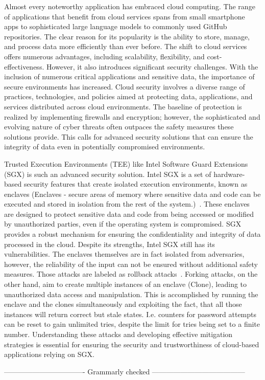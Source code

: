 
Almost every noteworthy application has embraced cloud computing. The range of applications that benefit from cloud services spans from small smartphone apps to sophisticated large language models to commonly used GitHub repositories. The clear reason for its popularity is the ability to store, manage, and process data more efficiently than ever before. The shift to cloud services offers numerous advantages, including scalability, flexibility, and cost-effectiveness. However, it also introduces significant security challenges. With the inclusion of numerous critical applications and sensitive data, the importance of secure environments has increased. Cloud security involves a diverse range of practices, technologies, and policies aimed at protecting data, applications, and services distributed across cloud environments. The baseline of protection is realized by implementing firewalls and encryption; however, the sophisticated and evolving nature of cyber threats often outpaces the safety measures these solutions provide. This calls for advanced security solutions that can ensure the integrity of data even in potentially compromised environments.


Trusted Execution Environments (TEE) like Intel Software Guard Extensions (SGX) is such an advanced security solution. Intel SGX is a set of hardware-based security features that create isolated execution environments, known as enclaves (Enclaves - secure areas of memory where sensitive data and code can be executed and stored in isolation from the rest of the system.)~\cite{nfw}. These enclaves are designed to protect sensitive data and code from being accessed or modified by unauthorized parties, even if the operating system is compromised. SGX provides a robust mechanism for ensuring the confidentiality and integrity of data processed in the cloud. Despite its strengths, Intel SGX still has its vulnerabilities. The enclaves themselves are in fact isolated from adversaries, however, the reliability of the input can not be ensured without additional safety measures. Those attacks are labeled as rollback attacks~\cite{esccc}. 
Forking attacks, on the other hand, aim to create multiple instances of an enclave (Clone), leading to unauthorized data access and manipulation. This is accomplished by running the enclave and the clones simultaneously and exploiting the fact, that all those instances will return correct but stale states. I.e. counters for password attempts can be reset to gain unlimited tries, despite the limit for tries being set to a finite number. Understanding these attacks and developing effective mitigation strategies is essential for ensuring the security and trustworthiness of cloud-based applications relying on SGX.

---------------------------------- Grammarly checked ---------------------------------------